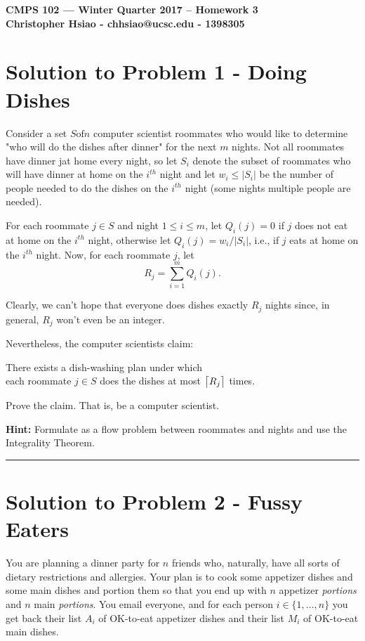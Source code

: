 \documentclass[11pt]{article}
\DeclarePairedDelimiter{\ceil}{\lceil}{\rceil}
\begin{document}
\begin{center}
{\bf\Large CMPS 102 --- Winter Quarter 2017 --  Homework 3}\\
{\bf Christopher Hsiao - chhsiao@ucsc.edu - 1398305}
\end{center}

\section*{Solution to Problem 1 - Doing Dishes}

Consider a set $S \text{of} n$ computer scientist roommates who would like to determine "who will do the dishes after dinner" for the next $m$ nights. Not all roommates have dinner jat home every night, so let $S_i$ denote the subset of roommates who will have dinner at home on the $i^{th}$ night and let $w_i \leq |S_i|$ be the number of people needed to do the dishes on the $i^{th}$ night (some nights multiple people are needed).

For each roommate $j \in S$ and night $1 \leq i \leq m$, let $Q_i(j) = 0$ if $j$ does not eat at home on the $i^{th}$ night, otherwise let $Q_i(j) = w_i/|S_i|$, i.e., if $j$ eats at home on the $i^{th}$ night. Now, for each roommate $j$, let
\begin{equation}
	R_j = \sum_{i=1}^{m} Q_i(j) .
\end{equation}

Clearly, we can't hope that everyone does dishes exactly $R_j$ nights since, in general, $R_j$ won't even be an integer.

Nevertheless, the computer scientists claim:
\begin{center}
	There exists a dish-washing plan under which\\
	each roommate $j \in S$ does the dishes at most $\ceil[\big]{R_j}$ times.
\end{center}

Prove the claim. That is, be a computer scientist.

\textbf{Hint:} Formulate as a flow problem between roommates and nights and use the Integrality Theorem.

\noindent\rule{17cm}{0.4pt}


\pagebreak

\section*{Solution to Problem 2 - Fussy Eaters}

You are planning a dinner party for $n$ friends who, naturally, have all sorts of dietary restrictions and allergies. Your plan is to cook some appetizer dishes and some main dishes and portion them so that you end up with $n$ appetizer \textit{portions} and $n$ main \textit{portions}. You email everyone, and for each person $i \in \{1, ... , n\}$ you get back their list $A_i$ of OK-to-eat appetizer dishes and their list $M_i$ of OK-to-eat main dishes.
\end{document}
